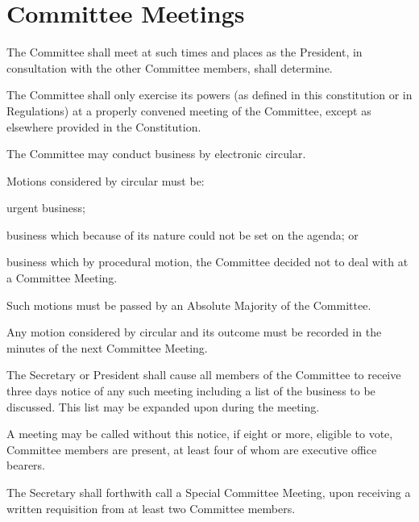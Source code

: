 \documentclass[a4paper]{article}
\begin{document}
\section{Committee Meetings} \label{sec:committee_meetings}
\begin{myEnumerate}
    \item The Committee shall meet at such times and places as the President, in consultation with the other Committee members, shall determine.
    \item The Committee shall only exercise its powers (as defined in this constitution or in Regulations) at a properly convened meeting of the Committee, except as elsewhere provided in the Constitution.
    \item The Committee may conduct business by electronic circular.
        \begin{myEnumerate}
            \item Motions considered by circular must be:
                \begin{myEnumerate}
                    \item urgent business;
                    \item business which because of its nature could not be set on the agenda; or
                    \item business which by procedural motion, the Committee decided not to deal with at a Committee Meeting.
                \end{myEnumerate} 
            \item Such motions must be passed by an Absolute Majority of the Committee.
            \item Any motion considered by circular and its outcome must be recorded in the minutes of the next Committee Meeting.
        \end{myEnumerate}
    \item The Secretary or President shall cause all members of the Committee to receive three days notice of any such meeting including a list of the business to be discussed. This list may be expanded upon during the meeting.
        \begin{myEnumerate}
            \item A meeting may be called without this notice, if eight or more, eligible to vote, Committee members are present, at least four of whom are executive office bearers.
        \end{myEnumerate}
    \item The Secretary shall forthwith call a Special Committee Meeting, upon receiving a written requisition from at least two Committee members.

\end{myEnumerate}
\end{document}
